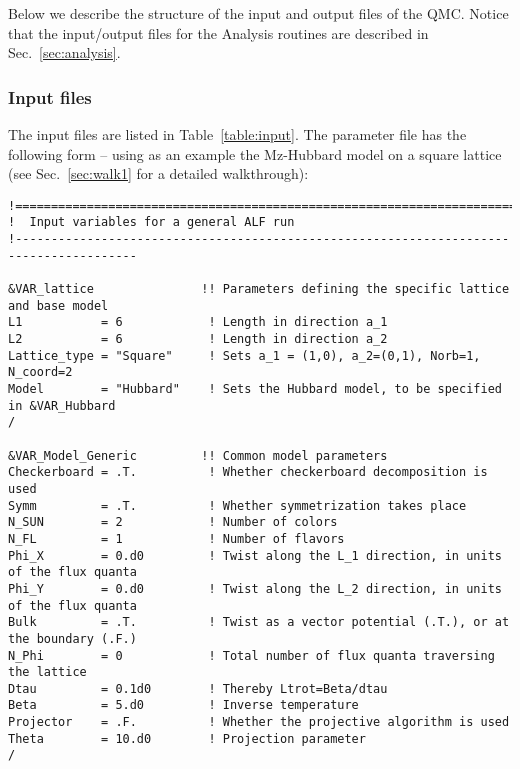 Below we describe the structure of the input and output files of the QMC. Notice that the input/output files for the Analysis routines are described in Sec.~\ref{sec:analysis}.

\subsubsection{Input files}\label{sec:input}
%

The input files are listed in Table~\ref{table:input}. 
The parameter file  has the following form --
using as an example  the Mz-Hubbard model on a square lattice (see Sec.~\ref{sec:walk1} for a detailed walkthrough):
%
\begin{lstlisting}[style=fortran,escapechar=\#,breaklines=true]
!=======================================================================================
!  Input variables for a general ALF run
!---------------------------------------------------------------------------------------

&VAR_lattice               !! Parameters defining the specific lattice and base model
L1           = 6            ! Length in direction a_1
L2           = 6            ! Length in direction a_2
Lattice_type = "Square"     ! Sets a_1 = (1,0), a_2=(0,1), Norb=1, N_coord=2
Model        = "Hubbard"    ! Sets the Hubbard model, to be specified in &VAR_Hubbard
/

&VAR_Model_Generic         !! Common model parameters
Checkerboard = .T.          ! Whether checkerboard decomposition is used
Symm         = .T.          ! Whether symmetrization takes place
N_SUN        = 2            ! Number of colors
N_FL         = 1            ! Number of flavors
Phi_X        = 0.d0         ! Twist along the L_1 direction, in units of the flux quanta
Phi_Y        = 0.d0         ! Twist along the L_2 direction, in units of the flux quanta
Bulk         = .T.          ! Twist as a vector potential (.T.), or at the boundary (.F.)
N_Phi        = 0            ! Total number of flux quanta traversing the lattice
Dtau         = 0.1d0        ! Thereby Ltrot=Beta/dtau
Beta         = 5.d0         ! Inverse temperature
Projector    = .F.          ! Whether the projective algorithm is used
Theta        = 10.d0        ! Projection parameter
/


\end{lstlisting}
